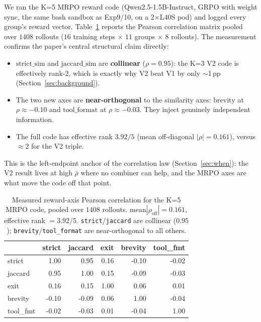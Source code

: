 \documentclass[11pt,a4paper]{article}
\begin{document}
We ran the K=5 MRPO reward code (Qwen2.5-1.5B-Instruct, GRPO with weight sync,
the same bash sandbox as Exp9/10, on a 2$\times$L40S pod) and logged every
group's reward vector.  Table~\ref{tab:corr-measured} reports the Pearson
correlation matrix pooled over $1408$ rollouts ($16$ training steps $\times$
$11$ groups $\times$ $8$ rollouts).  The measurement confirms the paper's
central structural claim directly:
\begin{itemize}[nosep]
\item $\mathrm{strict\_sim}$ and $\mathrm{jaccard\_sim}$ are \textbf{collinear}
  ($\rho = 0.95$): the K=3 V2 code is effectively rank-2, which is exactly why
  V2 beat V1 by only $\sim$1\,pp (Section~\ref{sec:background}).
\item The two new axes are \textbf{near-orthogonal} to the similarity axes:
  $\mathrm{brevity}$ at $\rho \approx -0.10$ and $\mathrm{tool\_format}$ at
  $\rho \approx -0.03$. They inject genuinely independent information.
\item The full code has effective rank $3.92/5$ (mean off-diagonal
  $|\rho| = 0.161$), versus $\approx 2$ for the V2 triple.
\end{itemize}
This is the left-endpoint anchor of the correlation law
(Section~\ref{sec:when}): the V2 result lives at high $\bar\rho$ where no
combiner can help, and the MRPO axes are what move the code off that point.

\begin{table}[h]
\centering
\caption{Measured reward-axis Pearson correlation for the K=5 MRPO code,
pooled over $1408$ rollouts. mean$|\rho_{\mathrm{off}}| = 0.161$, effective
rank $= 3.92/5$. \texttt{strict}/\texttt{jaccard} are collinear ($0.95$);
\texttt{brevity}/\texttt{tool\_format} are near-orthogonal to all others.}
\label{tab:corr-measured}
\begin{tabular}{@{}lrrrrr@{}}\toprule
 & strict & jaccard & exit & brevity & tool\_fmt \\ \midrule
strict     &  1.00 &  0.95 &  0.16 & -0.10 & -0.02 \\
jaccard    &  0.95 &  1.00 &  0.15 & -0.09 & -0.03 \\
exit       &  0.16 &  0.15 &  1.00 &  0.06 &  0.01 \\
brevity    & -0.10 & -0.09 &  0.06 &  1.00 & -0.04 \\
tool\_fmt  & -0.02 & -0.03 &  0.01 & -0.04 &  1.00 \\
\bottomrule\end{tabular}
\end{table}
\end{document}
